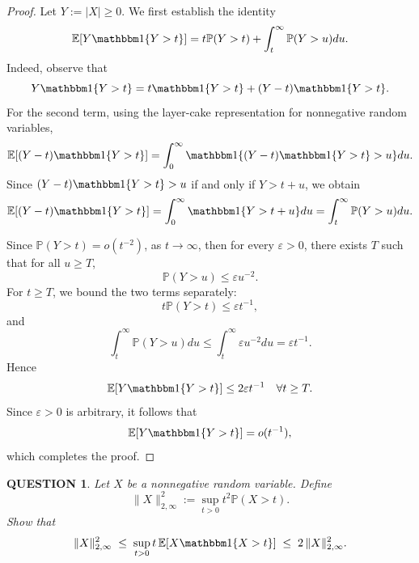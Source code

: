 \documentclass[12pt]{article}
\renewcommand{\(}{\left(}%
\renewcommand{\)}{\right)}%
\renewcommand{\[}{\left[}%
\renewcommand{\]}{\right]}%
\newcommand{\p}{\mathbb{P}}
\newtheorem{question}{QUESTION}[section]}
\newtheorem{proof}{Proof.}}
\begin{document}
\begin{proof}
Let $Y:=|X|\ge 0$. We first establish the identity
\begin{equation*}
\mathbb E [Y  \mathbbm 1\{Y>t\} ]
=
t \p(Y>t)
+
\int_t^\infty \p(Y>u) du.
\end{equation*}
Indeed, observe that
\begin{equation*}
Y  \mathbbm 1\{Y>t\}
=
t  \mathbbm 1\{Y>t\}
+
(Y-t)  \mathbbm 1\{Y>t\}.
\end{equation*}
For the second term, using the layer-cake representation for nonnegative random variables,
\begin{equation*}
\mathbb E[(Y-t)  \mathbbm 1\{Y>t\}]
=
\int_0^\infty
 \mathbbm 1\{(Y-t) \mathbbm 1\{Y>t\}>u\} du.
\end{equation*}
Since $(Y-t) \mathbbm 1\{Y>t\}>u$ if and only if $Y>t+u$, we obtain
\begin{equation*}
\mathbb E[(Y-t)  \mathbbm 1\{Y>t\}]
=
\int_0^\infty  \mathbbm 1\{Y>t+u\} du=\int_t^\infty \p(Y>u) du.
\end{equation*}

Since $\p(Y>t)=o(t^{-2})$, as $t\to\infty$,
then for every $\varepsilon>0$, there exists $T$ such that for all $u\ge T$,
\begin{equation*}
\p(Y>u)\le \varepsilon u^{-2}.
\end{equation*}
For $t\ge T$, we bound the two terms separately:
\begin{equation*}
t\p(Y>t)\le \varepsilon t^{-1},
\end{equation*}
and
\begin{equation*}
\int_t^\infty \p(Y>u) du
\le
\int_t^\infty \varepsilon u^{-2} du
=
\varepsilon t^{-1}.
\end{equation*}
Hence
\begin{equation*}
\mathbb E[Y \mathbbm 1\{Y>t\}]
\le
2\varepsilon t^{-1}
\quad \forall t\geq T.
\end{equation*}
Since $\varepsilon>0$ is arbitrary, it follows that
\begin{equation*}
\mathbb E[Y \mathbbm 1\{Y>t\}]
=
o(t^{-1}),
\end{equation*}
which completes the proof.
\end{proof}

\begin{question}
Let $X$ be a nonnegative random variable. Define
\begin{equation*}
\|X\|_{2,\infty}^2
:=
\sup_{t>0} t^2 \p(X>t).
\end{equation*}
Show that
\begin{equation*}
\|X\|_{2,\infty}^2
\;\le\;
\sup_{t>0} t\,\mathbb E [X \mathbbm 1\{X>t\} ]
\;\le\;
2\,\|X\|_{2,\infty}^2.
\end{equation*}
\end{question}
\end{document}

